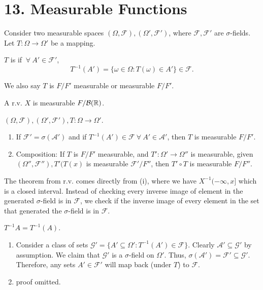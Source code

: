 \documentclass[class=article,crop=false]{standalone}
\begin{document}
\section*{13. Measurable Functions}
Consider two measurable spaces $ (\Omega,\mathcal{F}), (\Omega',\mathcal{F}')$, where $ \mathcal{F}, \mathcal{F}'$ are $\sigma$-fields. Let $ T: \Omega \to \Omega'$ be a mapping.

\begin{defn}[measurable]
$ T$ is   if  $ \ \forall \ A' \in \mathcal{F}'$,
\[
	T^{-1}(A')= \{\omega \in \Omega: T(\omega) \in A'\} \in \mathcal{F} 
.\] 
\end{defn}

We also say $ T$ is  $ F /F'$ measurable or measurable $ F / F'$.

\begin{eg}[]
	 A r.v. $ X $ is measurable  $ F / \mathcal{B}(\mathbb{R})$.
\end{eg}

\begin{thm}[13.1]
	$ (\Omega,\mathcal{F}), (\Omega',\mathcal{F}'), T: \Omega \to \Omega'$. 
	\begin{enumerate}[label=(\roman*)]
		\item If $ \mathcal{F}' = \sigma(\mathcal{A'})$ and if $ T^{-1}(A') \in \mathcal{F} \ \forall \ A' \in \mathcal{A}'$, then $ T$ is measurable  $ F / F'$.
		\item  Composition: If $ T$ is  $ F / F'$ measurable, and  $ T' : \Omega' \to \Omega''$ is measurable, given $(\Omega'',\mathcal{F}''), T'(T(x) $ is measurable $ \mathcal{F}' / F''$, then $ T' \circ T$ is measurable  $ F / F''$.
	\end{enumerate}
\end{thm}

\begin{remark}
	The theorem from r.v. comes directly from (i), where we have $ X^{-1}(-\infty,x]$ which is a closed interval. Instead of checking every inverse image of element in the generated $\sigma$-field is in $ \mathcal{F}$, we check if the inverse image of every element in the set that generated the $\sigma$-field is in $ \mathcal{F}$.
\end{remark}

\begin{notation}
	$ T^{-1}A = T^{-1}(A)$.
\end{notation}
\begin{prf}
\begin{enumerate}[label=(\roman*)]
	\item  Consider a class of sets $ \mathcal{G}'= \{A' \subseteq \Omega': T^{-1}(A') \in \mathcal{F}\} $. Clearly $ \mathcal{A}' \subseteq \mathcal{G}'$ by assumption. We claim that $ \mathcal{G}'$ is a $\sigma$-field on $ \Omega'$. Thus, $ \sigma(\mathcal{A}') = \mathcal{F}' \subseteq \mathcal{G}'$. Therefore, any sets $ A' \in \mathcal{F}'$ will map back (under $ T$) to  $ \mathcal{F}$.
	\item proof omitted.  
\end{enumerate}
\end{prf}
\end{document}

